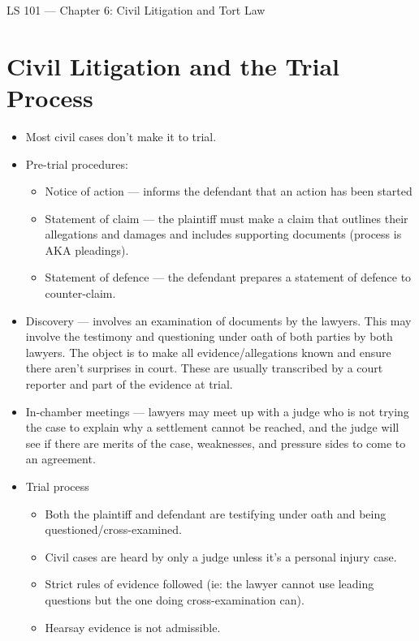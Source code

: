 \documentclass{article}
\author{Clement Tsang}
\begin{document}
\begin{center}
    \Large{LS 101 --- Chapter 6: Civil Litigation and Tort Law} 
\end{center}

\section{Civil Litigation and the Trial Process}
\begin{itemize}
    \item Most civil cases don't make it to trial.
    \item Pre-trial procedures:
        \begin{itemize}
            \item Notice of action --- informs the defendant that an action has been started
            \item Statement of claim --- the plaintiff must make a claim that outlines their allegations and damages and includes supporting documents (process is AKA pleadings).
            \item Statement of defence --- the defendant prepares a statement of defence to counter-claim.
        \end{itemize}
    \item Discovery --- involves an examination of documents by the lawyers.  This may involve the testimony and questioning under oath of both parties by both lawyers.  The object is to make all evidence/allegations known and ensure there aren't surprises in court.  These are usually transcribed by a court reporter and part of the evidence at trial.
    \item In-chamber meetings --- lawyers may meet up with a judge who is not trying the case to explain why a settlement cannot be reached, and the judge will see if there are merits of the case, weaknesses, and pressure sides to come to an agreement.
    \item Trial process
        \begin{itemize}
            \item Both the plaintiff and defendant are testifying under oath and being questioned/cross-examined.
            \item Civil cases are heard by only a judge unless it's a personal injury case.
            \item Strict rules of evidence followed (ie: the lawyer cannot use leading questions but the one doing cross-examination can).
            \item Hearsay evidence is not admissible.

\end{itemize}
\end{itemize}
\end{document}

